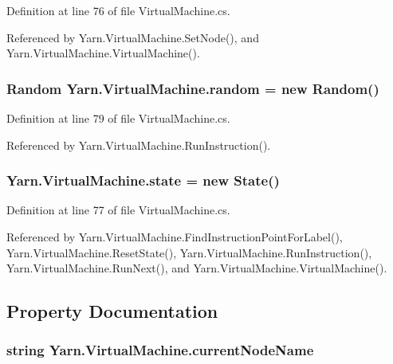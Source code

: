 Definition at line 76 of file Virtual\-Machine.\-cs.



Referenced by Yarn.\-Virtual\-Machine.\-Set\-Node(), and Yarn.\-Virtual\-Machine.\-Virtual\-Machine().

\hypertarget{a00156_a408485a00c7cc558428c86ed9dd04fca}{
\subsubsection[{random}]{\setlength{\rightskip}{0pt plus 5cm}Random Yarn.\-Virtual\-Machine.\-random = new Random()\hspace{0.3cm}{\ttfamily [private]}}}\label{a00156_a408485a00c7cc558428c86ed9dd04fca}


Definition at line 79 of file Virtual\-Machine.\-cs.



Referenced by Yarn.\-Virtual\-Machine.\-Run\-Instruction().

\hypertarget{a00156_a70f2ce6201cdd2430ceaa764ac614ca0}{
\subsubsection[{state}]{ Yarn.\-Virtual\-Machine.\-state = new {\bf State}()\hspace{0.3cm}{\ttfamily [private]}}}\label{a00156_a70f2ce6201cdd2430ceaa764ac614ca0}


Definition at line 77 of file Virtual\-Machine.\-cs.



Referenced by Yarn.\-Virtual\-Machine.\-Find\-Instruction\-Point\-For\-Label(), Yarn.\-Virtual\-Machine.\-Reset\-State(), Yarn.\-Virtual\-Machine.\-Run\-Instruction(), Yarn.\-Virtual\-Machine.\-Run\-Next(), and Yarn.\-Virtual\-Machine.\-Virtual\-Machine().



\subsection{Property Documentation}
\hypertarget{a00156_ab3afe8360a344c16c21213edb3641481}{
\subsubsection[{current\-Node\-Name}]{\setlength{\rightskip}{0pt plus 5cm}string Yarn.\-Virtual\-Machine.\-current\-Node\-Name\hspace{0.3cm}{\ttfamily [get]}}}\label{a00156_ab3afe8360a344c16c21213edb3641481}


